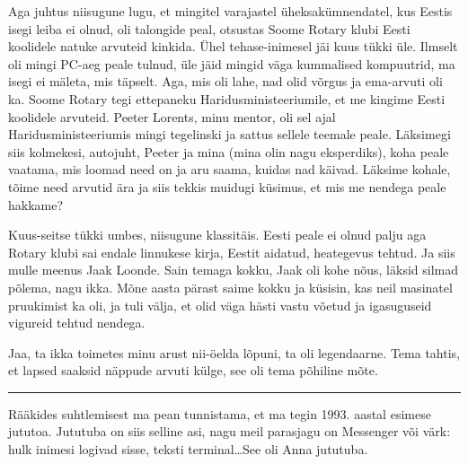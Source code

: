Aga juhtus niisugune lugu, et mingitel varajastel  üheksakümnendatel, kus Eestis  isegi leiba ei olnud, oli talongide peal,  otsustas Soome Rotary klubi Eesti koolidele natuke arvuteid kinkida. Ühel tehase-inimesel jäi kuus tükki üle. Ilmselt oli mingi PC-aeg peale tulnud, üle jäid  mingid väga kummalised kompuutrid, ma isegi ei mäleta, mis täpselt. Aga, mis oli lahe, nad olid võrgus ja ema-arvuti oli ka. Soome Rotary tegi ettepaneku Haridusministeeriumile, et me kingime Eesti koolidele  arvuteid. Peeter Lorents, minu mentor, oli sel ajal Haridusministeeriumis mingi tegelinski ja sattus sellele teemale peale. Läksimegi siis kolmekesi, autojuht, Peeter ja mina (mina olin nagu eksperdiks), koha peale vaatama, mis loomad need on ja aru saama, kuidas nad käivad. Läksime kohale, tõime need arvutid ära ja siis tekkis muidugi küsimus, et mis me nendega peale hakkame? 


Kuus-seitse tükki umbes, niisugune klassitäis. Eesti peale ei olnud palju aga Rotary klubi sai endale linnukese kirja, Eestit aidatud, heategevus tehtud. Ja siis mulle meenus Jaak Loonde. Sain temaga kokku, Jaak oli kohe nõus, läksid silmad põlema, nagu ikka.  Mõne aasta pärast saime kokku ja küsisin, kas neil masinatel  pruukimist ka oli,  ja tuli välja, et olid väga hästi vastu võetud ja  igasuguseid vigureid tehtud nendega. 


Jaa, ta ikka toimetes minu arust nii-öelda lõpuni, ta oli legendaarne. Tema tahtis, et lapsed saaksid näppude arvuti külge, see oli tema põhiline mõte.


\bigskip
\noindent\rule{.3\textwidth}{.7pt}
\bigskip

Rääkides  suhtlemisest ma pean tunnistama, et ma tegin 1993. aastal esimese jututoa. Jututuba on siis selline asi, nagu meil parasjagu on Messenger või värk: hulk inimesi logivad sisse, teksti terminal\ldots See oli Anna jututuba.



